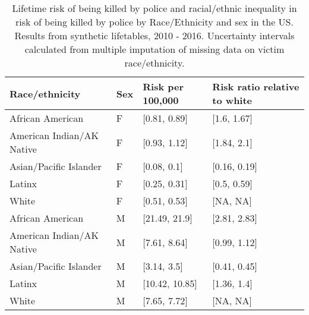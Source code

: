 \begin{table}[ht]
\centering
\caption{Lifetime risk of being killed by police and racial/ethnic inequality in risk of being killed by police by Race/Ethnicity and sex in the US. Results from synthetic lifetables, 2010 - 2016. Uncertainty intervals calculated from multiple imputation of missing data on victim race/ethnicity.} 
\begin{tabular}{llll}
  \hline
Race/ethnicity & Sex & Risk per 100,000 & Risk ratio relative to white \\ 
  \hline
African American & F & [0.81, 0.89] & [1.6, 1.67] \\ 
  American Indian/AK Native & F & [0.93, 1.12] & [1.84, 2.1] \\ 
  Asian/Pacific Islander & F & [0.08, 0.1] & [0.16, 0.19] \\ 
  Latinx & F & [0.25, 0.31] & [0.5, 0.59] \\ 
  White & F & [0.51, 0.53] & [NA, NA] \\ 
  African American & M & [21.49, 21.9] & [2.81, 2.83] \\ 
  American Indian/AK Native & M & [7.61, 8.64] & [0.99, 1.12] \\ 
  Asian/Pacific Islander & M & [3.14, 3.5] & [0.41, 0.45] \\ 
  Latinx & M & [10.42, 10.85] & [1.36, 1.4] \\ 
  White & M & [7.65, 7.72] & [NA, NA] \\ 
   \hline
\end{tabular}
\end{table}
